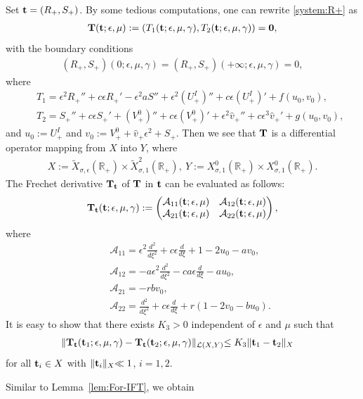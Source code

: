 \documentclass[11pt,a4paper]{article}
\numberwithin{equation}{section}
\numberwithin{figure}{section}
\newcommand\bt{{\bf t}}
\newcommand\bT{{\bf T}}
\newcommand\ep{\epsilon}
\newcommand\bea{\begin{eqnarray}}
\newcommand\eea{\end{eqnarray}}
\newcommand\beaa{\begin{eqnarray*}}
\newcommand\eeaa{\end{eqnarray*}}
\begin{document}
Set $\bt=(R_+,S_+)$. By some tedious computations, one can rewrite \eqref{system:R+} as
\beaa
\bT(\bt;\epsilon,\mu):=(T_1(\bt;\epsilon,\mu,\gamma), T_2(\bt;\epsilon,\mu,\gamma))
={\bf0},
\eeaa
with the boundary conditions
\beaa
(R_+,S_+)(0;\epsilon,\mu,\gamma)=(R_+,S_+)(+\infty;\epsilon,\mu,\gamma)=0,
\eeaa
where
\beaa
&&T_1=\ep^2R_{+}''+c\ep R_{+}'-\ep^2aS''+\ep^2(U_{+}^I)''+c\ep (U_{+}^I)'+f(u_0,{v}_0),\\
&&T_2=S_{+}''+c\ep S_{+}'+(V_{+}^0)''+c\ep (V_{+}^0)'+\ep^2 \hat{v}_{+}''+c\ep^3\hat{v}_{+}'+g(u_0,{v}_0),
\eeaa
and $u_0:=U^I_{+}$ and $v_0:=V_{+}^0+\hat{v}_+\ep^2+S_+$.
Then we see that $\bT$ is a differential operator mapping from $X$ into $Y$,
where
\beaa
X:=\widetilde{X}_{\sigma,\epsilon}(\mathbb{R}_+)\times \widetilde{X}^2_{\sigma,1}(\mathbb{R}_+),\ Y:=X^0_{\sigma,1}(\mathbb{R}_+)\times X^0_{\sigma,1}(\mathbb{R}_+).
\eeaa
The Frechet derivative $\bT_{\bt}$  of $\bT$ in ${\bt}$ can be evaluated as follows:
\beaa
\bT_{\bt}(\bt;\epsilon,\mu,\gamma):=
 \begin{pmatrix}
 \mathcal{A}_{11}(\bt;\epsilon,\mu) &  \mathcal{A}_{12}(\bt;\epsilon,\mu)\\
   \mathcal{A}_{21}(\bt;\epsilon,\mu) &  \mathcal{A}_{22}(\bt;\epsilon,\mu)
 \end{pmatrix},
\eeaa
where
\beaa
 &&\mathcal{A}_{11}=\ep^2\frac{d^2}{d \xi^2}+c\ep \frac{d}{d \xi}+1-2u_0-av_0,\\
 &&\mathcal{A}_{12}=-a\ep^2\frac{d^2}{d \xi^2}-ca\ep \frac{d}{d \xi}-au_0,\\
 &&\mathcal{A}_{21}=-rbv_0,\\
 &&\mathcal{A}_{22}=\frac{d^2}{d \xi^2}+c\ep \frac{d}{d \xi}+r(1-2v_0-bu_0).
\eeaa
It is easy to show that there exists $K_3>0$ independent of $\epsilon$ and $\mu$ such that
\bea\label{modulus-of-continuity}
\lVert  \bT_{\bt}(\bt_1;\epsilon,\mu,\gamma)-\bT_{\bt}(\bt_2;\epsilon,\mu,\gamma)\lVert_{\mathcal{L}(X,Y)}\leq K_3 \lVert \bt_1-\bt_2 \lVert_{X}\quad
\eea
for all $\bt_i\in X$ with $\lVert \bt_i\lVert_{X}\ll1$, $i=1,2$.


Similar to Lemma~\ref{lem:For-IFT}, we obtain
\end{document}
